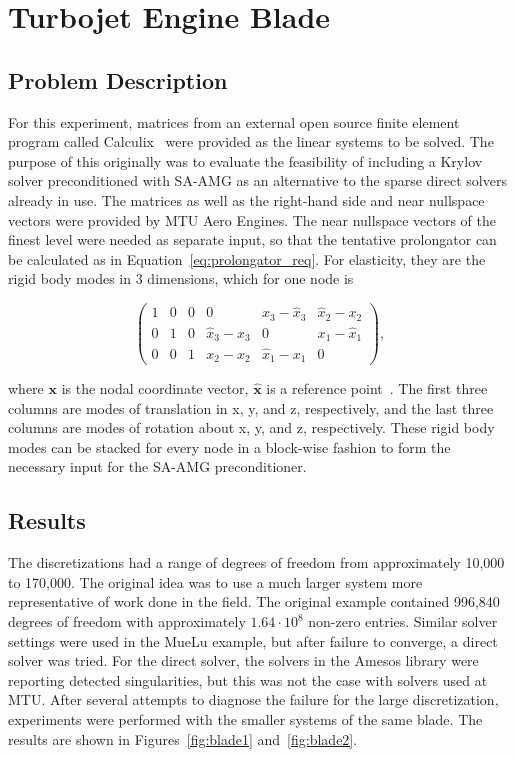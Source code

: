 \section{Turbojet Engine Blade}
\subsection{Problem Description}
For this experiment, matrices from an external open source finite element program called Calculix~\cite{dhondt2017calculix} were provided as the linear systems to be solved. The purpose of this originally was to evaluate the feasibility of including a Krylov solver preconditioned with SA-AMG as an alternative to the sparse direct solvers already in use. The matrices as well as the right-hand side and near nullspace vectors were provided by MTU Aero Engines. The near nullspace vectors of the finest level were needed as separate input, so that the tentative prolongator can be calculated as in Equation~\ref{eq:prolongator_req}. For elasticity, they are the rigid body modes in 3 dimensions, which for one node is

\begin{equation}
    \begin{pmatrix}
        1 & 0 & 0 & 0 & x_3 - \hat{x}_3 & \hat{x}_2 - x_2 \\
        0 & 1 & 0 & \hat{x}_3 - x_3 & 0 & x_1 - \hat{x}_1 \\
        0 & 0 & 1 & x_2 - \hat{x}_2 & \hat{x}_1 - x_1 & 0
    \end{pmatrix},
\end{equation}

where $\mathbf{x}$ is the nodal coordinate vector, $\mathbf{\hat{x}}$ is a reference point~\cite{Gee2006}. The first three columns are modes of translation in x, y, and z, respectively, and the last three columns are modes of rotation about x, y, and z, respectively. These rigid body modes can be stacked for every node in a block-wise fashion to form the necessary input for the SA-AMG preconditioner.

\subsection{Results}
The discretizations had a range of degrees of freedom from approximately 10,000 to 170,000. The original idea was to use a much larger system more representative of work done in the field. The original example contained 996,840 degrees of freedom with approximately $1.64 \cdot 10^8$ non-zero entries. Similar solver settings were used in the MueLu example, but after failure to converge, a direct solver was tried. For the direct solver, the solvers in the Amesos library were reporting detected singularities, but this was not the case with solvers used at MTU. After several attempts to diagnose the failure for the large discretization, experiments were performed with the smaller systems of the same blade. The results are shown in Figures~\ref{fig:blade1} and~\ref{fig:blade2}.

